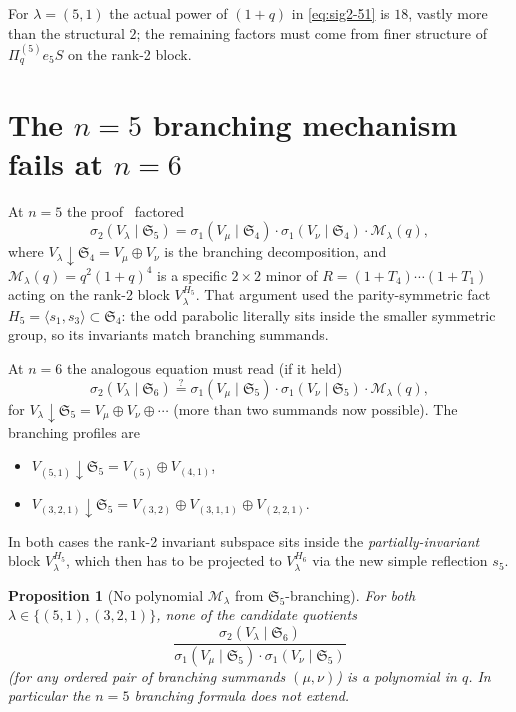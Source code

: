\documentclass[11pt]{article}
\theoremstyle{plain}
\newtheorem{proposition}[theorem]{Proposition}
\theoremstyle{definition}
\theoremstyle{remark}
\newcommand{\Sym}{\mathfrak{S}}
\newcommand{\Pibs}{\Pi_q}
\begin{document}
For $\lambda = (5,1)$ the actual power of $(1+q)$ in \eqref{eq:sig2-51} is
$18$, vastly more than the structural $2$; the remaining factors must come
from finer structure of $\Pibs^{(5)} e_5 S$ on the rank-2 block.

\section{The $n=5$ branching mechanism fails at $n=6$}

At $n = 5$ the proof~\cite{sigma2n5} factored
\[ \sigma_2(V_\lambda \mid \Sym_5) = \sigma_1(V_\mu \mid \Sym_4) \cdot \sigma_1(V_\nu \mid \Sym_4) \cdot \mathcal{M}_\lambda(q), \]
where $V_\lambda \downarrow \Sym_4 = V_\mu \oplus V_\nu$ is the branching
decomposition, and $\mathcal{M}_\lambda(q) = q^2(1+q)^4$ is a specific
$2 \times 2$ minor of $R = (1+T_4)\cdots(1+T_1)$ acting on the rank-2 block
$V_\lambda^{H_5}$. That argument used the parity-symmetric fact
$H_5 = \langle s_1, s_3\rangle \subset \Sym_4$: the odd parabolic literally
sits inside the smaller symmetric group, so its invariants match branching
summands.

At $n = 6$ the analogous equation must read (if it held)
\[ \sigma_2(V_\lambda \mid \Sym_6) \stackrel{?}{=} \sigma_1(V_\mu \mid \Sym_5) \cdot \sigma_1(V_\nu \mid \Sym_5) \cdot \mathcal{M}_\lambda(q), \]
for $V_\lambda \downarrow \Sym_5 = V_\mu \oplus V_\nu \oplus \cdots$ (more
than two summands now possible). The branching profiles are
\begin{itemize}
\item $V_{(5,1)} \downarrow \Sym_5 = V_{(5)} \oplus V_{(4,1)}$,
\item $V_{(3,2,1)} \downarrow \Sym_5 = V_{(3,2)} \oplus V_{(3,1,1)} \oplus V_{(2,2,1)}$.
\end{itemize}
In both cases the rank-2 invariant subspace sits inside the
\emph{partially-invariant} block $V_\lambda^{H_5}$, which then has to be
projected to $V_\lambda^{H_6}$ via the new simple reflection $s_5$.

\begin{proposition}[No polynomial $\mathcal{M}_\lambda$ from $\Sym_5$-branching]
For both $\lambda \in \{(5,1),(3,2,1)\}$, none of the candidate quotients
\[ \frac{\sigma_2(V_\lambda \mid \Sym_6)}{\sigma_1(V_\mu\mid\Sym_5)\cdot\sigma_1(V_\nu\mid\Sym_5)} \]
(for any ordered pair of branching summands $(\mu,\nu)$) is a polynomial
in $q$. In particular the $n = 5$ branching formula does not extend.
\end{proposition}
\end{document}
